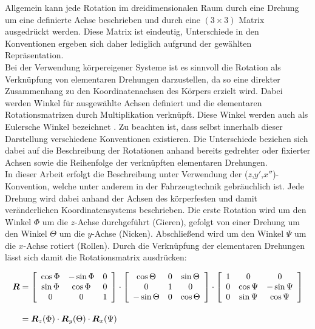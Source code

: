 
Allgemein kann jede Rotation im dreidimensionalen Raum durch eine Drehung um eine definierte Achse beschrieben und durch eine $(3 \times 3)$ Matrix ausgedrückt werden. Diese Matrix ist eindeutig, Unterschiede in den Konventionen ergeben sich daher lediglich aufgrund der gewählten Repräsentation.\\
Bei der Verwendung körpereigener Systeme ist es sinnvoll die Rotation als Verknüpfung von elementaren Drehungen darzustellen, da so eine direkter Zusammenhang zu den Koordinatenachsen des Körpers erzielt wird. Dabei werden Winkel für ausgewählte Achsen definiert und die elementaren Rotationsmatrizen durch Multiplikation verknüpft. Diese Winkel werden auch als Eulersche Winkel bezeichnet \cite{Foley1990}. Zu beachten ist, dass selbst innerhalb dieser Darstellung verschiedene Konventionen existieren. Die Unterschiede beziehen sich dabei auf die Beschreibung der Rotationen anhand bereits gedrehter oder fixierter Achsen sowie die Reihenfolge der verknüpften elementaren Drehungen.\\

In dieser Arbeit erfolgt die Beschreibung unter Verwendung der ($z$,$y'$,$x''$)-Konvention, welche unter anderem in der Fahrzeugtechnik gebräuchlich ist. Jede Drehung wird dabei anhand der Achsen des körperfesten und damit veränderlichen Koordinatensystems beschrieben. Die erste Rotation wird um den Winkel $\Phi$ um die $z$-Achse durchgeführt (Gieren), gefolgt von einer Drehung um den Winkel $\Theta$ um die $y$-Achse (Nicken). Abschließend wird um den Winkel $\Psi$ um die $x$-Achse rotiert (Rollen). Durch die Verknüpfung der elementaren Drehungen lässt sich damit die Rotationsmatrix ausdrücken:

\begin{equation}
\begin{split}
\mbox{\boldmath{$R$}} & = \left[ \begin{array}{ccc}  \cos{\Phi} & -\sin{\Phi} & 0 \\ \sin{\Phi} & \cos{\Phi} & 0 \\ 0 & 0 & 1  \end{array} \right] \cdot \left[ \begin{array}{ccc}  \cos{\Theta} & 0 & \sin{\Theta} \\ 0 & 1 & 0 \\ -\sin{\Theta} & 0 & \cos{\Theta}  \end{array} \right] \cdot \left[ \begin{array}{ccc}  1 & 0 & 0 \\ 0 & \cos{\Psi} & -\sin{\Psi} \\ 0 & \sin{\Psi} & \cos{\Psi}  \end{array} \right] \\[1em]
& = \mbox{\boldmath{$R$}}_z(\Phi) \cdot \mbox{\boldmath{$R$}}_y(\Theta) \cdot \mbox{\boldmath{$R$}}_x(\Psi)
\end{split}
\end{equation}




